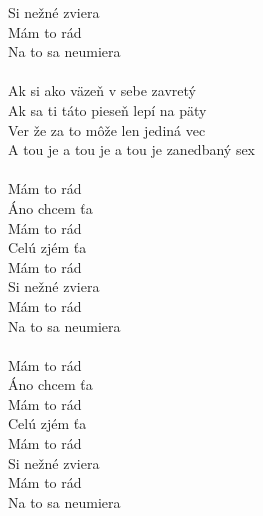 \begin{multicols}{2}
Si nežné zviera\\
Mám to rád\\
Na to sa neumiera\\
\columnbreak
\\
Ak si ako väzeň v sebe zavretý\\
Ak sa ti táto pieseň lepí na päty\\
Ver že za to môže len jediná vec\\
A tou je a tou je a tou je zanedbaný sex\\
\\
Mám to rád\\
Áno chcem ťa\\
Mám to rád\\
Celú zjém ťa\\
Mám to rád\\
Si nežné zviera\\
Mám to rád\\
Na to sa neumiera\\
\\
Mám to rád\\
Áno chcem ťa\\
Mám to rád\\
Celú zjém ťa\\
Mám to rád\\
Si nežné zviera\\
Mám to rád\\
Na to sa neumiera\\
\end{multicols}